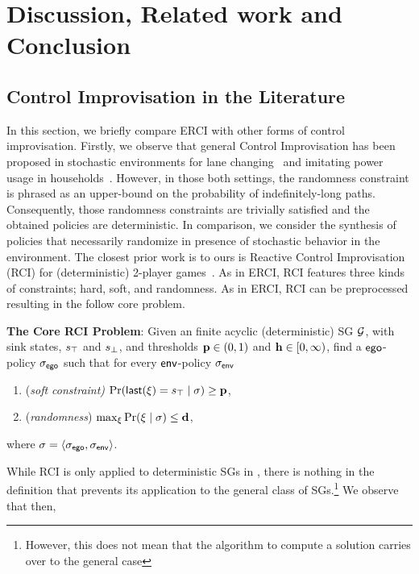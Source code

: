 \section{Discussion, Related work and Conclusion}\label{sec:related}

\subsection{Control Improvisation in the Literature}

In this section, we briefly compare ERCI with other forms of control
improvisation. Firstly, we observe that general Control Improvisation
has been proposed in stochastic environments for lane
changing~\cite{DBLP:conf/cdc/GeM18} and imitating power usage in
households~\cite{DBLP:conf/iotdi/AkkayaFVDLS16}. However, in those
both settings, the randomness constraint is phrased as an upper-bound
on the probability of indefinitely-long paths. Consequently, those
randomness constraints are trivially satisfied and the obtained
policies are deterministic.  In comparison, we consider the synthesis
of policies that necessarily randomize in presence of stochastic
behavior in the environment. The closest prior work is to ours
is Reactive Control Improvisation (RCI) for (deterministic) 2-player games~\cite{DBLP:conf/cav/FremontS18}. As in ERCI, RCI features
 three kinds of constraints; hard, soft, and randomness. As in ERCI,
RCI can be preprocessed resulting in the follow core problem.
\begin{mdframed}
  \textbf{The Core RCI Problem}: Given an finite acyclic
  (deterministic) SG $\mathcal{G}$, with sink states, $s_{\top}$ and $s_{\bot}$,
  and thresholds $\mathbf{p} \in (0,1)$ and
  $\mathbf{h} \in [0,\infty)$, find a $\mathsf{ego}$-policy ${\sigma_{\mathsf{ego}}}$
  such that for every $\mathsf{env}$-policy ${\sigma_{\mathsf{env}}}$
  \begin{enumerate}
  \item (\emph{soft constraint)}
    $\Pr(\mathsf{last}({\xi}) = s_{\top} \mid \sigma) \geq \mathbf{p}$,
  \item (\emph{randomness})
    $\max_\xi{\Pr(\xi\mid \sigma)} \leq \mathbf{d}$,
   \end{enumerate}
   where $\sigma = \langle {\sigma_{\mathsf{ego}}}, {\sigma_{\mathsf{env}}} \rangle$.
 \end{mdframed}
While RCI is only applied to deterministic SGs in
\cite{DBLP:conf/cav/FremontS18}, there is nothing in the definition
that prevents its application to the general class of
SGs.\footnote{However, this does not mean that the algorithm to compute
a solution carries over to the general case}  We observe that then,
